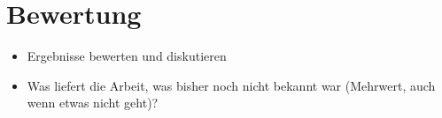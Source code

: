 \chapter{Bewertung}

\begin{itemize}
	\item Ergebnisse bewerten und diskutieren
	\item Was liefert die Arbeit, was bisher noch nicht bekannt war (Mehrwert, auch wenn etwas nicht geht)?
\end{itemize}
